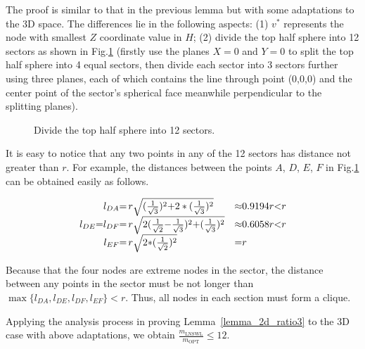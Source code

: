 \documentclass[journal,10pt]{IEEEtran}
\begin{document}
\begin{IEEEproof}
The proof is similar to that in the previous lemma but with some adaptations to the 3D space. The differences lie in the following aspects: (1) $v^{*}$ represents the node with smallest $Z$ coordinate value in $H$; (2) divide the top half sphere into 12 sectors as shown in Fig.\ref{fig_3d12part} (firstly use the planes $X{=}0$ and $Y{=}0$ to split the top half sphere into 4 equal sectors, then divide each sector into 3 sectors further using three planes, each of which contains the line through point (0,0,0) and the center point of the sector's spherical face meanwhile perpendicular to the splitting planes).

\begin{figure}[htb]
\caption{Divide the top half sphere into 12 sectors.}
\label{fig_3d12part}
\end{figure}

It is easy to notice that any two points in any of the 12 sectors has distance not greater than $r$. For example, the distances between the points $A$, $D$, $E$, $F$ in Fig.\ref{fig_3d12part} can be obtained easily as follows.

\begin{equation}
\label{eqn_pr_3d12_1}
\begin{array}{rll}
l_{DA}{=}&\hspace{-3mm}r\sqrt{(\frac{1}{\sqrt{3}})^2{+}2*(\frac{1}{\sqrt{3}})^2}&{\approx}0.9194r{<}r\\
l_{DE}{=}l_{DF}{=}&\hspace{-3mm}r\sqrt{2(\frac{1}{\sqrt{2}}{-}\frac{1}{\sqrt{3}})^2{+}(\frac{1}{\sqrt{3}})^2}&{\approx}0.6058r{<}r\\
l_{EF}{=}&\hspace{-3mm}r\sqrt{2{*}(\frac{1}{\sqrt{2}})^2}&{=}r
\end{array}
\end{equation}

Because that the four nodes are extreme nodes in the sector, the distance between any points in the sector must be not longer than $\max\{l_{DA},l_{DE},l_{DF},l_{EF}\}{<}r$. Thus, all nodes in each section must form a clique.

Applying the analysis process in proving Lemma~\ref{lemma_2d_ratio3} to the 3D case with above adaptations, we obtain $\frac{m_\text{LNSWL}}{m_\text{OPT}}{\leq}12$.
\end{IEEEproof}
\end{document}
